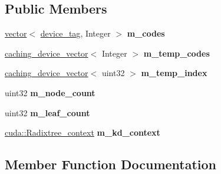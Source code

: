 \subsection*{Public Members}
\begin{DoxyCompactItemize}
\item 
\mbox{\label{structcugar_1_1cuda_1_1_kd__builder_ae0697065717fc4e1716950edebaa5c2a}} 
\hyperlink{structcugar_1_1vector}{vector}$<$ \hyperlink{structcugar_1_1device__tag}{device\+\_\+tag}, Integer $>$ {\bfseries m\+\_\+codes}
\item 
\mbox{\label{structcugar_1_1cuda_1_1_kd__builder_a01293ef7ba88b485ed06b71f004edef4}} 
\hyperlink{structcugar_1_1caching__device__vector}{caching\+\_\+device\+\_\+vector}$<$ Integer $>$ {\bfseries m\+\_\+temp\+\_\+codes}
\item 
\mbox{\label{structcugar_1_1cuda_1_1_kd__builder_a9c7d09a9195fa322565fd5ac7b3c3aa2}} 
\hyperlink{structcugar_1_1caching__device__vector}{caching\+\_\+device\+\_\+vector}$<$ uint32 $>$ {\bfseries m\+\_\+temp\+\_\+index}
\item 
\mbox{\label{structcugar_1_1cuda_1_1_kd__builder_ad46ebcf11ed0b7958da2b153c2c942a0}} 
uint32 {\bfseries m\+\_\+node\+\_\+count}
\item 
\mbox{\label{structcugar_1_1cuda_1_1_kd__builder_a92e40df7182e091e9233d4ff99c08ebd}} 
uint32 {\bfseries m\+\_\+leaf\+\_\+count}
\item 
\mbox{\label{structcugar_1_1cuda_1_1_kd__builder_a6494783d773e12e7a6e4e5cb9c445bbc}} 
\hyperlink{structcugar_1_1cuda_1_1_radixtree__context}{cuda\+::\+Radixtree\+\_\+context} {\bfseries m\+\_\+kd\+\_\+context}
\end{DoxyCompactItemize}


\subsection{Member Function Documentation}
\mbox{\label{structcugar_1_1cuda_1_1_kd__builder_a3406ba54cf8cb747ac03065e0df5398f}} 
